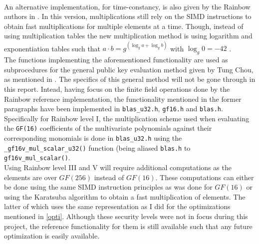 \medskip\\
An alternative implementation, for time-constancy, is also given by the Rainbow authors in \cite{rainbownist}. In this version, multiplications still rely on the SIMD instructions to obtain fast multiplications for multiple elements at a time. Though, instead of using multiplication tables the new multiplication method is using logarithm and exponentiation tables such that $a \cdot b = g^{(\log_g a +  \log_g b)}$ with $\log_g 0 = -42$ \cite{rainbownist}.
\medskip\\
The functions implementing the aforementioned functionality are used as subprocedures for the general public key evaluation method given by Tung Chou, as mentioned in \cite{rainbownist}. The specifics of this general method will not be gone through in this report. Intead, having focus on the finite field operations done by the Rainbow reference implementation, the functionality mentioned in the former paragraphs have been implemented in \texttt{blas\_u32.h}, \texttt{gf16.h} and \texttt{blas.h}. Specifically for Rainbow level I, the multiplication scheme used when evaluating the \texttt{GF(16)} coefficients of the multivariate polynomials against their corresponding monomials is done in \texttt{blas\_u32.h} using the \texttt{\_gf16v\_mul\_scalar\_u32()} function (being aliased \texttt{blas.h} to \texttt{gf16v\_mul\_scalar()}.
\medskip\\
Using Rainbow level III and V will require additional computations as the elements are over $GF(256)$ instead of $GF(16)$. These computations can either be done using the same SIMD instruction principles as was done for $GF(16)$ or using the Karatsuba algorithm to obtain a fast multiplication of elements. The latter of which uses the same representation as I did for the optimizations mentioned in \cref{opti}. Although these security levels were not in focus during this project, the reference functionality for them is still available such that any future optimization is easily available.
